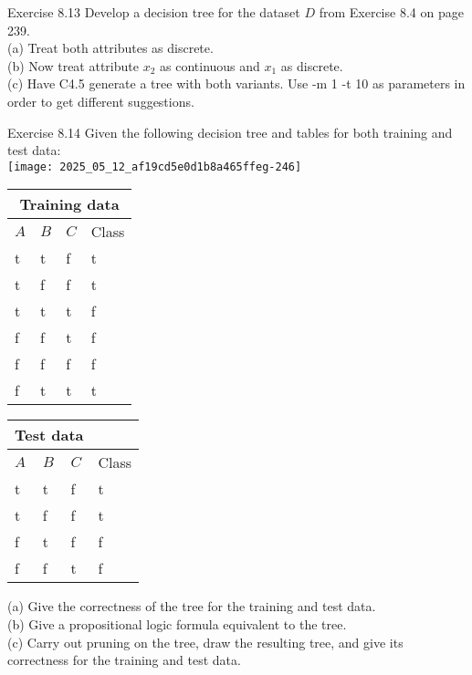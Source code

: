 \documentclass[10pt]{article}
\begin{document}
Exercise 8.13 Develop a decision tree for the dataset $D$ from Exercise 8.4 on page 239.\\
(a) Treat both attributes as discrete.\\
(b) Now treat attribute $x_{2}$ as continuous and $x_{1}$ as discrete.\\
(c) Have C4.5 generate a tree with both variants. Use -m 1 -t 10 as parameters in order to get different suggestions.

Exercise 8.14 Given the following decision tree and tables for both training and test data:\\
\texttt{[image: 2025\_05\_12\_af19cd5e0d1b8a465ffeg-246]}

\begin{center}
\begin{tabular}{llll}
\multicolumn{4}{c}{Training data} \\
\hline
$A$ & $B$ & $C$ & Class \\
\hline
t & t & f & t \\
\hline
t & f & f & t \\
\hline
t & t & t & f \\
\hline
f & f & t & f \\
\hline
f & f & f & f \\
\hline
f & t & t & t \\
\hline
\end{tabular}
\end{center}

\begin{center}
\begin{tabular}{llll}
\multicolumn{3}{c}{Test data} &  \\
\hline
$A$ & $B$ & $C$ & Class \\
\hline
t & t & f & t \\
\hline
t & f & f & t \\
\hline
f & t & f & f \\
\hline
f & f & t & f \\
\hline
\end{tabular}
\end{center}

(a) Give the correctness of the tree for the training and test data.\\
(b) Give a propositional logic formula equivalent to the tree.\\
(c) Carry out pruning on the tree, draw the resulting tree, and give its correctness for the training and test data.
\end{document}

